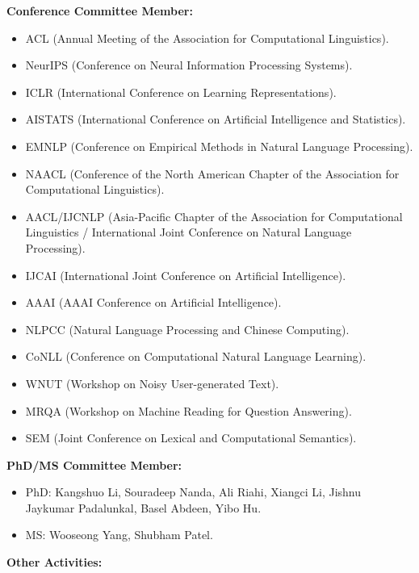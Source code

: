 \noindent \textbf{Conference Committee Member:}
\begin{itemize}[label={},leftmargin=15pt]
\item ACL (Annual Meeting of the Association for Computational Linguistics).
\item NeurIPS (Conference on Neural Information Processing Systems).
\item ICLR (International Conference on Learning Representations).
\item AISTATS (International Conference on Artificial Intelligence and Statistics).
\item EMNLP (Conference on Empirical Methods in Natural Language Processing).
\item NAACL (Conference of the North American Chapter of the Association for Computational Linguistics).
\item AACL/IJCNLP (Asia-Pacific Chapter of the Association for Computational Linguistics / International Joint Conference on Natural Language Processing).
\item IJCAI (International Joint Conference on Artificial Intelligence).
\item AAAI (AAAI Conference on Artificial Intelligence).
\item NLPCC (Natural Language Processing and Chinese Computing).
\item CoNLL (Conference on Computational Natural Language Learning).
\item WNUT (Workshop on Noisy User-generated Text).
\item MRQA (Workshop on Machine Reading for Question Answering).
\item SEM (Joint Conference on Lexical and Computational Semantics).
\end{itemize}


\noindent \textbf{PhD/MS Committee Member:}

\begin{itemize}[label={},leftmargin=15pt]
    \item PhD: 
    Kangshuo Li, 
    Souradeep Nanda, 
    Ali Riahi, 
    Xiangci Li, 
    Jishnu Jaykumar Padalunkal, 
    Basel Abdeen, 
    Yibo Hu.
    \item MS: 
    Wooseong Yang, 
    Shubham Patel.
\end{itemize}




\noindent \textbf{Other Activities:}


